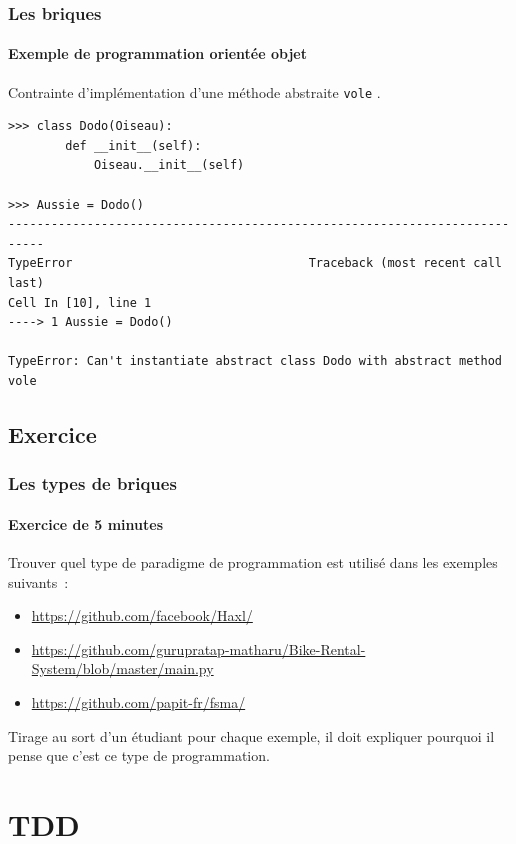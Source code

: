 \documentclass{beamer}
\begin{document}
    \begin{frame}[fragile]
        \transdissolve
        \frametitle{Les briques}
        \framesubtitle{Exemple de programmation orientée objet}
        Contrainte d'implémentation d'une méthode abstraite \lstinline{vole} .

        \begin{lstlisting}
>>> class Dodo(Oiseau):
        def __init__(self):
            Oiseau.__init__(self)

>>> Aussie = Dodo()
---------------------------------------------------------------------------
TypeError                                 Traceback (most recent call last)
Cell In [10], line 1
----> 1 Aussie = Dodo()

TypeError: Can't instantiate abstract class Dodo with abstract method vole
        \end{lstlisting}
    \end{frame}

    \subsection{Exercice}\label{subsec:briques-exe}
    \begin{frame}
        \transdissolve
        \frametitle{Les types de briques}
        \framesubtitle{Exercice \execcounterdispinc{} de 5 minutes}
        Trouver quel type de paradigme de programmation est utilisé dans les exemples suivants~:
        \begin{itemize}
            \item \url{https://github.com/facebook/Haxl/}
            \item \url{https://github.com/gurupratap-matharu/Bike-Rental-System/blob/master/main.py}
            \item \url{https://github.com/papit-fr/fsma/}
        \end{itemize}
        Tirage au sort d'un étudiant pour chaque exemple, il doit expliquer pourquoi il pense que c'est ce type de programmation.
    \end{frame}


    \section{TDD}
\end{document}
